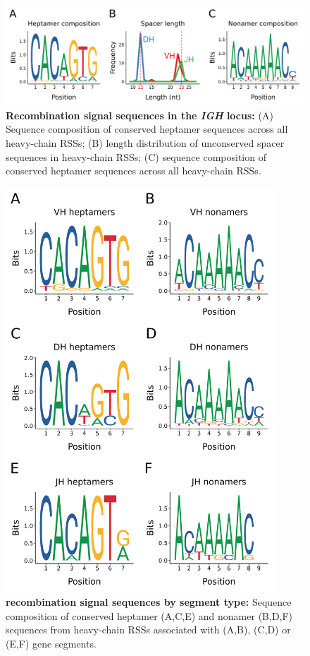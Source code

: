 	\begin{figure}
	\centering
	\includegraphics[width=\textwidth]{_Figures/png/nfu-rss-seqlogo-all}
	\caption[Recombination signal sequences in the \Nfu \textit{IGH} locus]{\textbf{Recombination signal sequences in the \Nfu \textit{IGH} locus:} (A) Sequence composition of conserved heptamer sequences across all \Nfu heavy-chain RSSs; (B) length distribution of unconserved spacer sequences in \Nfu heavy-chain RSSs; (C) sequence composition of conserved heptamer sequences across all \Nfu heavy-chain RSSs.}
	\label{fig:nfu-rss-seqlogo-all}
	\end{figure}
	
\begin{figure}
	\centering
	\includegraphics[width=0.9\textwidth]{_Figures/png/nfu-rss-seqlogo-sep}
	\caption[\Nfu recombination signal sequences by segment type]{\textbf{\Nfu recombination signal sequences by segment type:} Sequence composition of conserved heptamer (A,C,E) and nonamer (B,D,F) sequences from \Nfu heavy-chain RSSs associated with \vh (A,B), \dh (C,D) or \jh (E,F) gene segments.}
	\label{fig:nfu-rss-seqlogo-sep}
	\end{figure}

